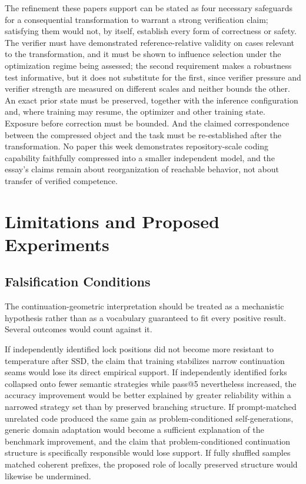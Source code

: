 \documentclass[11pt]{article}
\begin{document}
The refinement these papers support can be stated as four necessary safeguards for a consequential transformation to warrant a strong verification claim; satisfying them would not, by itself, establish every form of correctness or safety. The verifier must have demonstrated reference-relative validity on cases relevant to the transformation, and it must be shown to influence selection under the optimization regime being assessed; the second requirement makes a robustness test informative, but it does not substitute for the first, since verifier pressure and verifier strength are measured on different scales and neither bounds the other. An exact prior state must be preserved, together with the inference configuration and, where training may resume, the optimizer and other training state. Exposure before correction must be bounded. And the claimed correspondence between the compressed object and the task must be re-established after the transformation. No paper this week demonstrates
repository-scale coding capability faithfully compressed into a smaller
independent model, and the essay's claims remain about reorganization of
reachable behavior, not about transfer of verified competence.

\section{Limitations and Proposed Experiments}

\subsection{Falsification Conditions}

The continuation-geometric interpretation should be treated as a mechanistic hypothesis rather than as a vocabulary guaranteed to fit every positive result. Several outcomes would count against it.

If independently identified lock positions did not become more resistant to temperature after SSD, the claim that training stabilizes narrow continuation seams would lose its direct empirical support. If independently identified forks collapsed onto fewer semantic strategies while pass@5 nevertheless increased, the accuracy improvement would be better explained by greater reliability within a narrowed strategy set than by preserved branching structure. If prompt-matched unrelated code produced the same gain as problem-conditioned self-generations, generic domain adaptation would become a sufficient explanation of the benchmark improvement, and the claim that problem-conditioned continuation structure is specifically responsible would lose support. If fully shuffled samples matched coherent prefixes, the proposed role of locally preserved structure would likewise be undermined.
\end{document}
